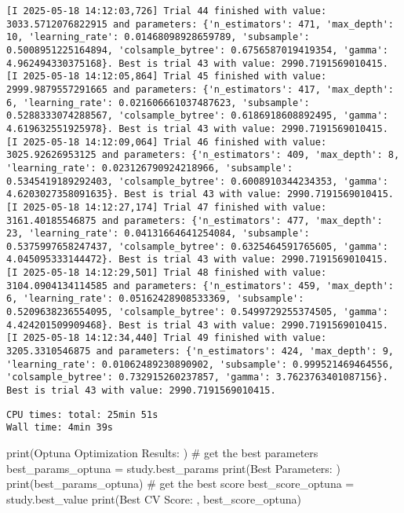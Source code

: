 \documentclass[
  letterpaper,
  DIV=11,
  numbers=noendperiod]{scrreprt}
\newenvironment{Shaded}{\begin{snugshade}}{\end{snugshade}}
\newcommand{\BuiltInTok}[1]{\textcolor[rgb]{0.00,0.23,0.31}{#1}}
\newcommand{\CommentTok}[1]{\textcolor[rgb]{0.37,0.37,0.37}{#1}}
\newcommand{\NormalTok}[1]{\textcolor[rgb]{0.00,0.23,0.31}{#1}}
\newcommand{\OperatorTok}[1]{\textcolor[rgb]{0.37,0.37,0.37}{#1}}
\newcommand{\StringTok}[1]{\textcolor[rgb]{0.13,0.47,0.30}{#1}}
\begin{document}
\begin{verbatim}
[I 2025-05-18 14:12:03,726] Trial 44 finished with value: 3033.5712076822915 and parameters: {'n_estimators': 471, 'max_depth': 10, 'learning_rate': 0.01468098928659789, 'subsample': 0.5008951225164894, 'colsample_bytree': 0.6756587019419354, 'gamma': 4.962494330375168}. Best is trial 43 with value: 2990.7191569010415.
[I 2025-05-18 14:12:05,864] Trial 45 finished with value: 2999.9879557291665 and parameters: {'n_estimators': 417, 'max_depth': 6, 'learning_rate': 0.021606661037487623, 'subsample': 0.5288333074288567, 'colsample_bytree': 0.6186918608892495, 'gamma': 4.619632551925978}. Best is trial 43 with value: 2990.7191569010415.
[I 2025-05-18 14:12:09,064] Trial 46 finished with value: 3025.92626953125 and parameters: {'n_estimators': 409, 'max_depth': 8, 'learning_rate': 0.023126790924218966, 'subsample': 0.5345419189292403, 'colsample_bytree': 0.6008910344234353, 'gamma': 4.6203027358091635}. Best is trial 43 with value: 2990.7191569010415.
[I 2025-05-18 14:12:27,174] Trial 47 finished with value: 3161.40185546875 and parameters: {'n_estimators': 477, 'max_depth': 23, 'learning_rate': 0.04131664641254084, 'subsample': 0.5375997658247437, 'colsample_bytree': 0.6325464591765605, 'gamma': 4.045095333144472}. Best is trial 43 with value: 2990.7191569010415.
[I 2025-05-18 14:12:29,501] Trial 48 finished with value: 3104.0904134114585 and parameters: {'n_estimators': 459, 'max_depth': 6, 'learning_rate': 0.05162428908533369, 'subsample': 0.5209638236554095, 'colsample_bytree': 0.5499729255374505, 'gamma': 4.424201509909468}. Best is trial 43 with value: 2990.7191569010415.
[I 2025-05-18 14:12:34,440] Trial 49 finished with value: 3205.3310546875 and parameters: {'n_estimators': 424, 'max_depth': 9, 'learning_rate': 0.01062489230890902, 'subsample': 0.999521469464556, 'colsample_bytree': 0.732915260237857, 'gamma': 3.7623763401087156}. Best is trial 43 with value: 2990.7191569010415.
\end{verbatim}

\begin{verbatim}
CPU times: total: 25min 51s
Wall time: 4min 39s
\end{verbatim}

\begin{Shaded}
\begin{Highlighting}[]
\BuiltInTok{print}\NormalTok{(}\StringTok{\textquotesingle{}Optuna Optimization Results: \textquotesingle{}}\NormalTok{)}
\CommentTok{\# get the best parameters}
\NormalTok{best\_params\_optuna }\OperatorTok{=}\NormalTok{ study.best\_params}
\BuiltInTok{print}\NormalTok{(}\StringTok{\textquotesingle{}Best Parameters: \textquotesingle{}}\NormalTok{)}
\BuiltInTok{print}\NormalTok{(best\_params\_optuna)}
\CommentTok{\# get the best score}
\NormalTok{best\_score\_optuna }\OperatorTok{=}\NormalTok{ study.best\_value}
\BuiltInTok{print}\NormalTok{(}\StringTok{\textquotesingle{}Best CV Score: \textquotesingle{}}\NormalTok{, best\_score\_optuna)}
\end{Highlighting}
\end{Shaded}
\end{document}

